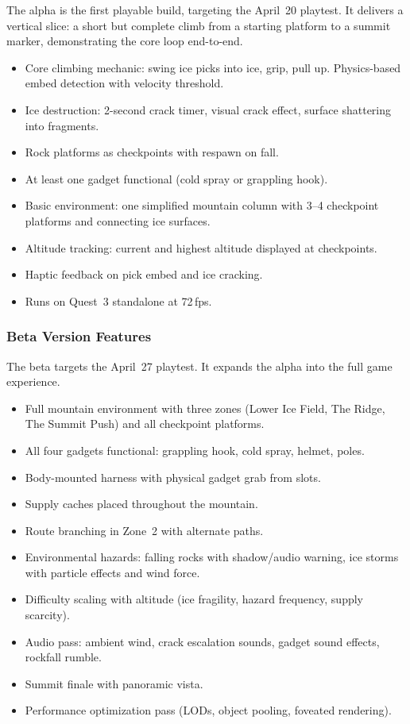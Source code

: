 \documentclass[12pt]{article}
\begin{document}
The alpha is the first playable build, targeting the April~20 playtest. It delivers a vertical slice: a short but complete climb from a starting platform to a summit marker, demonstrating the core loop end-to-end.

\begin{itemize}[leftmargin=2em]
    \item Core climbing mechanic: swing ice picks into ice, grip, pull up. Physics-based embed detection with velocity threshold.
    \item Ice destruction: 2-second crack timer, visual crack effect, surface shattering into fragments.
    \item Rock platforms as checkpoints with respawn on fall.
    \item At least one gadget functional (cold spray or grappling hook).
    \item Basic environment: one simplified mountain column with 3--4 checkpoint platforms and connecting ice surfaces.
    \item Altitude tracking: current and highest altitude displayed at checkpoints.
    \item Haptic feedback on pick embed and ice cracking.
    \item Runs on Quest~3 standalone at 72\,fps.
\end{itemize}

\subsubsection{Beta Version Features}

The beta targets the April~27 playtest. It expands the alpha into the full game experience.

\begin{itemize}[leftmargin=2em]
    \item Full mountain environment with three zones (Lower Ice Field, The Ridge, The Summit Push) and all checkpoint platforms.
    \item All four gadgets functional: grappling hook, cold spray, helmet, poles.
    \item Body-mounted harness with physical gadget grab from slots.
    \item Supply caches placed throughout the mountain.
    \item Route branching in Zone~2 with alternate paths.
    \item Environmental hazards: falling rocks with shadow/audio warning, ice storms with particle effects and wind force.
    \item Difficulty scaling with altitude (ice fragility, hazard frequency, supply scarcity).
    \item Audio pass: ambient wind, crack escalation sounds, gadget sound effects, rockfall rumble.
    \item Summit finale with panoramic vista.
    \item Performance optimization pass (LODs, object pooling, foveated rendering).
\end{itemize}
\end{document}
